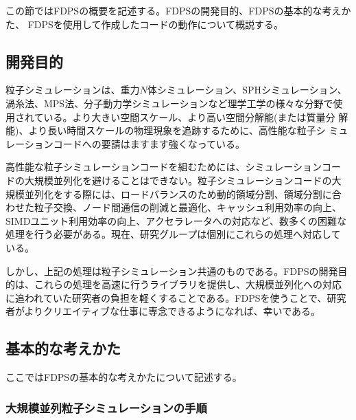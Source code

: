この節ではFDPSの概要を記述する。FDPSの開発目的、FDPSの基本的な考えかた、
FDPSを使用して作成したコードの動作について概説する。

\subsection{開発目的}

粒子シミュレーションは、重力$N$体シミュレーション、SPHシミュレーション、
渦糸法、MPS法、分子動力学シミュレーションなど理学工学の様々な分野で使
用されている。より大きい空間スケール、より高い空間分解能(または質量分
解能)、より長い時間スケールの物理現象を追跡するために、高性能な粒子シ
ミュレーションコードへの要請はますます強くなっている。

高性能な粒子シミュレーションコードを組むためには、シミュレーションコー
ドの大規模並列化を避けることはできない。粒子シミュレーションコードの大
規模並列化をする際には、ロードバランスのため動的領域分割、領域分割に合
わせた粒子交換、ノード間通信の削減と最適化、キャッシュ利用効率の向上、
SIMDユニット利用効率の向上、アクセラレータへの対応など、数多くの困難な
処理を行う必要がある。現在、研究グループは個別にこれらの処理へ対応して
いる。

しかし、上記の処理は粒子シミュレーション共通のものである。FDPSの開発目
的は、これらの処理を高速に行うライブラリを提供し、大規模並列化への対応
に追われていた研究者の負担を軽くすることである。FDPSを使うことで、研究
者がよりクリエイティブな仕事に専念できるようになれば、幸いである。

\subsection{基本的な考えかた}

ここではFDPSの基本的な考えかたについて記述する。

\subsubsection{大規模並列粒子シミュレーションの手順}
\label{sec:overview_concept_abstraktion}

